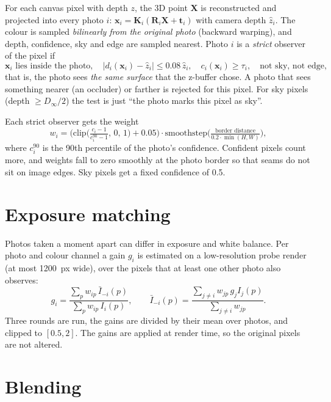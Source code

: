 \documentclass[11pt, a4paper]{article}
\newcommand{\R}{\mathbf{R}}
\newcommand{\X}{\mathbf{X}}
\newcommand{\bt}{\mathbf{t}}
\begin{document}
For each canvas pixel with depth $z$, the 3D point $\X$ is reconstructed and projected into every photo $i$:
$\mathbf{x}_i = \mathbf{K}_i(\R_i \X + \bt_i)$ with camera depth $\hat z_i$. The colour is sampled \emph{bilinearly from the original photo}
(backward warping), and depth, confidence, sky and edge are sampled nearest. Photo $i$ is a \emph{strict} observer of the pixel if
\begin{equation}
  \mathbf{x}_i \text{ lies inside the photo}, \quad |d_i(\mathbf{x}_i) - \hat z_i| \le 0.08\,\hat z_i, \quad c_i(\mathbf{x}_i) \ge \tau_i, \quad \text{not sky, not edge},
\end{equation}
that is, the photo sees \emph{the same surface} that the z-buffer chose. A photo that sees something nearer
(an occluder) or farther is rejected for this pixel. For sky pixels (depth $\ge D_\infty/2$) the test is just ``the photo marks this pixel as sky''.

Each strict observer gets the weight
\begin{equation}
  w_i = \bigl(\mathrm{clip}\bigl(\tfrac{c_i - 1}{c^{90}_i - 1},\,0,\,1\bigr) + 0.05\bigr)\cdot \mathrm{smoothstep}\!\bigl(\tfrac{\text{border distance}}{0.2\cdot\min(H,W)}\bigr),
\end{equation}
where $c^{90}_i$ is the 90th percentile of the photo's confidence. Confident pixels count more, and weights fall to zero smoothly
at the photo border so that seams do not sit on image edges. Sky pixels get a fixed confidence of 0.5.

\section{Exposure matching}

Photos taken a moment apart can differ in exposure and white balance. Per photo and colour channel a gain $g_i$ is
estimated on a low-resolution probe render (at most 1200~px wide), over the pixels that at least one other photo also observes:
\begin{equation}
  g_i = \frac{\sum_p w_{ip}\,\bar I_{-i}(p)}{\sum_p w_{ip}\,I_i(p)},
  \qquad \bar I_{-i}(p) = \frac{\sum_{j\ne i} w_{jp}\,g_j I_j(p)}{\sum_{j\ne i} w_{jp}} .
\end{equation}
Three rounds are run, the gains are divided by their mean over photos, and clipped to $[0.5, 2]$. The gains are applied at
render time, so the original pixels are not altered.

\section{Blending}
\end{document}
